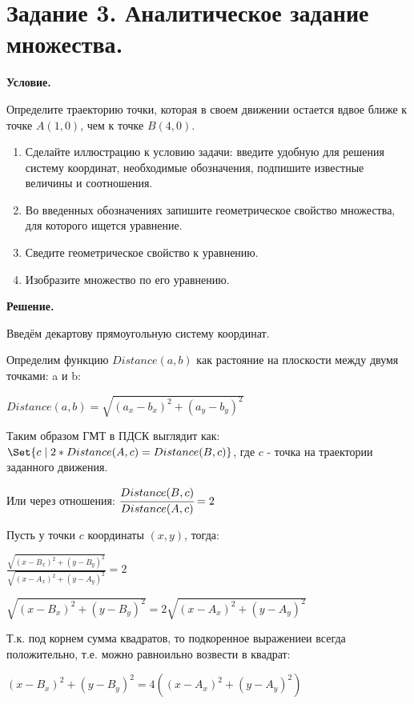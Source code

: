 \section{Задание 3. Аналитическое задание множества.}

\textbf{Условие.}

Определите траекторию точки, которая в своем движении остается вдвое ближе к
точке $A(1,0)$, чем к точке $B(4,0)$.

\begin{enumerate}
    \item Сделайте иллюстрацию к условию задачи: введите удобную для решения систему
координат, необходимые обозначения, подпишите известные величины и
соотношения.
    \item Во введенных обозначениях запишите геометрическое свойство множества, для
которого ищется уравнение.
    \item Сведите геометрическое свойство к уравнению.
    \item Изобразите множество по его уравнению.
\end{enumerate}
\vspace{10mm}
\textbf{Решение.}

Введём декартову прямоугольную систему координат.

Определим функцию $Distance(a, b)$ как растояние на плоскости между двумя точками: a и b:

$Distance(a, b) = \sqrt{(a_x - b_x)^2 + (a_y - b_y)^2}$

Таким образом ГМТ в ПДСК выглядит как: $\Set{c \mid 2*Distance(A, c) = Distance(B, c)}$, где $c$ -  точка на траектории заданного движения.

Или через отношения: $\cfrac{Distance(B, c)}{Distance(A, c)} = 2$

Пусть у точки $c$ координаты $(x, y)$, тогда:

\vspace{1mm}

$\displaystyle \frac{\sqrt{(x-B_x)^2 + (y - B_y)^2}}{\sqrt{(x-A_x)^2 + (y-A_y)^2}} = 2$\\
\vspace{1mm}

$\sqrt{(x-B_x)^2 + (y - B_y)^2} = 2 \sqrt{(x-A_x)^2 + (y-A_y)^2}$

Т.к. под корнем сумма квадратов, то подкоренное выражениеи всегда положительно, т.е. можно равноильно возвести в квадрат:

$(x-B_x)^2 + (y - B_y)^2 = 4 ((x-A_x)^2 + (y-A_y)^2)$

